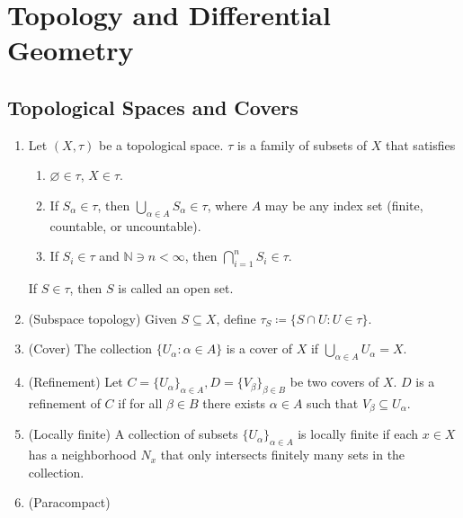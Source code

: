 \section{Topology and Differential Geometry}
\label{sec:topology-and-geometry}

\subsection{Topological Spaces and Covers}
\begin{enumerate}
    \item Let $(X,\tau)$ be a topological space. $\tau$ is a family of subsets of $X$ that satisfies
        \begin{enumerate}
            \item $\varnothing \in \tau$, $X\in \tau$.
            \item If $S_\alpha \in \tau$, then $\bigcup_{\alpha \in A} S_\alpha \in \tau $, where $A$ may be any index set (finite, countable, or uncountable).
            \item If $S_i \in \tau$ and $\mathbb{N} \ni n < \infty$, then $\bigcap_{i=1}^n S_i \in \tau$.
        \end{enumerate}
        If $S \in \tau$, then $S$ is called an open set.
    \item (Subspace topology) Given $S \subseteq X$, define $\tau_S \coloneqq \{S \cap U: U\in \tau\}$.
    \item (Cover) The collection $\{U_\alpha: \alpha\in A\}$ is a cover of $X$ if $\underset{\alpha\in A}{\bigcup} U_\alpha=X$.
    \item (Refinement) Let $C=\{U_\alpha\}_{\alpha\in A}, D=\{V_\beta\}_{\beta\in B}$ be two covers of $X$. $D$ is a refinement of $C$ if for all $\beta\in B$ there exists $\alpha\in A$ such that $V_\beta \subseteq U_\alpha$.
    \item (Locally finite) A collection of subsets $\{U_\alpha\}_{\alpha\in A}$ is locally finite if each $x\in X$ has a neighborhood $N_x$ that only intersects finitely many sets in the collection.
    \item (Paracompact) 
\end{enumerate}

